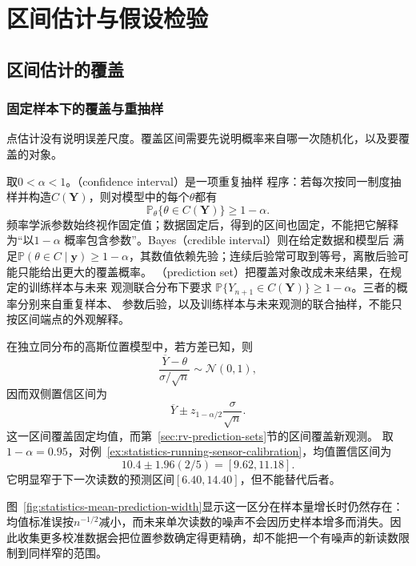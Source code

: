 \section{区间估计与假设检验}
\label{sec:statistics-intervals-tests}
\subsection{区间估计的覆盖}
\subsubsection{固定样本下的覆盖与重抽样}
\label{sec:statistics-intervals-quantiles}
\label{sec:statistics-resampling}
点估计没有说明误差尺度。覆盖区间需要先说明概率来自哪一次随机化，以及要覆盖的对象。
\begin{definition}[置信、可信与预测覆盖]
  \label{def:statistics-interval-coverage}
  取\(0<\alpha<1\)。（confidence interval）是一项重复抽样
程序：若每次按同一制度抽样并构造\(C(\bm Y)\)，则对模型中的每个\(\theta\)都有
\[
  \mathbb{P}_\theta\{\theta\in C(\bm Y)\}\geq1-\alpha.
\]
频率学派参数始终视作固定值；数据固定后，得到的区间也固定，不能把它解释为“以\(1-\alpha\)
概率包含参数”。Bayes（credible interval）则在给定数据和模型后
满足\(\mathbb{P}(\theta\in C\mid\bm y)\geq1-\alpha\)，其数值依赖先验；连续后验常可取到等号，离散后验可能只能给出更大的覆盖概率。
（prediction set）把覆盖对象改成未来结果，在规定的训练样本与未来
观测联合分布下要求
\(\mathbb{P}\{Y_{n+1}\in C(\bm Y)\}\geq1-\alpha\)。三者的概率分别来自重复样本、
参数后验，以及训练样本与未来观测的联合抽样，不能只按区间端点的外观解释。
\end{definition}

在独立同分布的高斯位置模型中，若方差已知，则
\[
  \frac{\overline Y-\theta}{\sigma/\sqrt n}\sim\mathcal N(0,1),
\]
因而双侧置信区间为
\[
  \overline Y\pm z_{1-\alpha/2}\frac{\sigma}{\sqrt n}.
\]
这一区间覆盖固定均值，而第~\ref{sec:rv-prediction-sets}节的区间覆盖新观测。
取\(1-\alpha=0.95\)，对例~\ref{ex:statistics-running-sensor-calibration}，均值置信区间为
\[
10.4\pm1.96(2/5)=[9.62,11.18].
\]
它明显窄于下一次读数的预测区间\([6.40,14.40]\)，但不能替代后者。

图~\ref{fig:statistics-mean-prediction-width}显示这一区分在样本量增长时仍然存在：均值标准误按\(n^{-1/2}\)减小，而未来单次读数的噪声不会因历史样本增多而消失。因此收集更多校准数据会把位置参数确定得更精确，却不能把一个有噪声的新读数限制到同样窄的范围。

